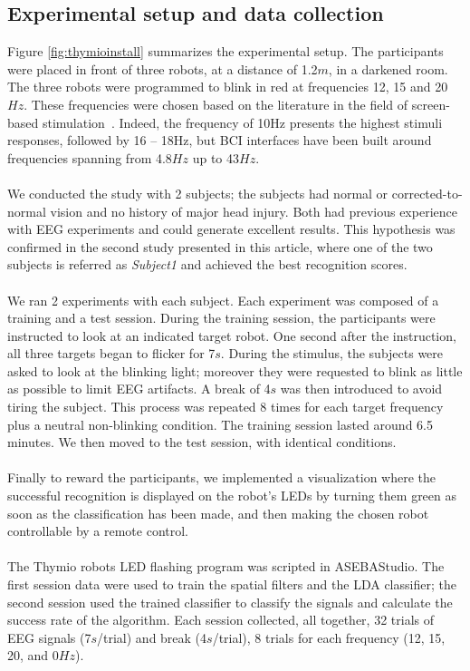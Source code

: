 \documentclass[smallextended]{svjour3}
\begin{document}
\subsection{Experimental setup and data collection}
Figure \ref{fig:thymioinstall} summarizes the experimental setup. The participants were placed in front of three robots, at a distance of 1.2$m$, in a darkened room. The three robots were programmed to blink in red at frequencies 12, 15 and 20$Hz$. These frequencies were chosen based on the literature in the field of screen-based stimulation~\cite{Zhu2010}.
Indeed, the frequency of 10Hz presents the highest stimuli responses, followed by 16 -- 18Hz, but BCI interfaces have been built around frequencies spanning from 4.8$Hz$ up to 43$Hz$.\\
\\
We conducted the study with 2 subjects; the subjects had normal or corrected-to-normal vision and no history of major head injury. 
Both had previous experience with EEG experiments and could generate excellent results. 
This hypothesis was confirmed in the second study presented in this article, where one of the two subjects is referred as \textit{Subject1} and achieved the best recognition scores. \\
\\
We ran 2 experiments with each subject. Each experiment was composed of a training and a test session. During the training session, the participants were instructed to look at an indicated target robot. One second after the instruction, all three targets began to flicker for 7$s$. During the stimulus, the subjects were asked to look at the blinking light; moreover they were requested to blink as little as possible to limit EEG artifacts. A break of 4$s$ was then introduced to avoid tiring the subject. This process was repeated 8 times for each target frequency plus a neutral non-blinking condition. The training session lasted around 6.5 minutes. We then moved to the test session, with identical conditions.\\
\\
Finally to reward the participants, we implemented a visualization where the successful recognition is displayed on the robot's LEDs by turning them green as soon as the classification has been made, and then making the chosen robot controllable by a remote control.\\
\\
The Thymio robots LED flashing program was scripted in ASEBAStudio. The first session data were used to train the spatial filters and the LDA classifier; the second session used the trained classifier to classify the signals and calculate the success rate of the algorithm. Each session collected, all together, 32 trials of EEG signals (7$s$/trial) and break (4$s$/trial), 8 trials for each frequency (12, 15, 20, and 0$Hz$). 
\end{document}
